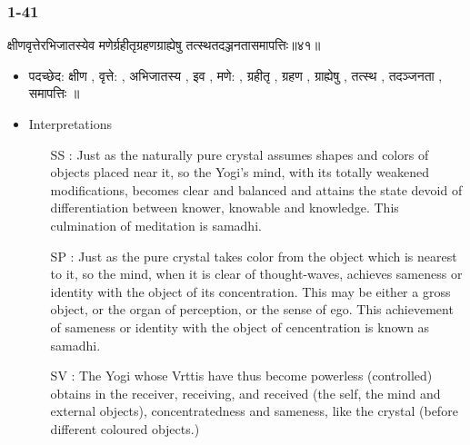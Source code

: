 \begin{frame}[fragile]\frametitle{1-41}
\begin{sanskrit}
क्षीणवृत्तेरभिजातस्येव मणेर्ग्रहीतृग्रहणग्राह्येषु तत्स्थतदञ्जनतासमापत्तिः॥४१॥
\end{sanskrit}

	\begin{itemize}
	\item पदच्छेद: क्षीण , वृत्ते: , अभिजातस्य , इव , मणे: , ग्रहीतृ , ग्रहण , ग्राह्येषु , तत्स्थ , तदञ्जनता , समापत्तिः ॥
	\item Interpretations
		\begin{itemize}	

		\item [SS]: Just as the naturally pure crystal assumes shapes and colors of objects placed near it, so the Yogi’s mind, with its totally weakened modifications, becomes clear and balanced and attains the state devoid of differentiation between knower, knowable and knowledge. This culmination of meditation is samadhi.
		\item [SP]: Just as the pure crystal takes color from the object which is nearest to it, so the mind, when it is clear of thought-waves, achieves sameness or identity with the object of its concentration. This may be either a gross object, or the organ of perception, or the sense of ego. This achievement of sameness or identity with the object of cencentration is known as samadhi.
		\item [SV]: The Yogi whose Vrttis have thus become powerless (controlled) obtains in the receiver, receiving, and received (the self, the mind and external objects), concentratedness and sameness, like the crystal (before different coloured objects.) 
		\end{itemize}
	\end{itemize}
	
\end{frame}


